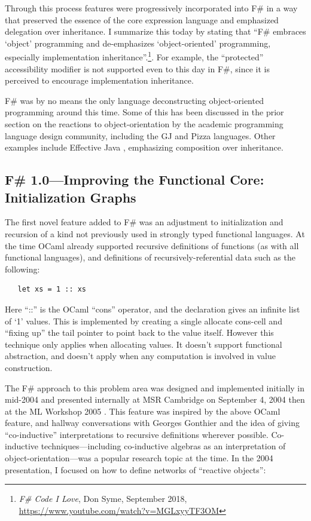 \documentclass[acmsmall]{acmart}\settopmatter{}
\begin{document}
Through this process features were progressively incorporated into F\# in a way that preserved the essence of the core expression language and emphasized delegation over inheritance.  I summarize this today by stating that “F\# embraces ‘object’ programming and de-emphasizes ‘object-oriented’ programming, especially implementation inheritance”.\footnote{\textit{F\# Code I Love}, Don Syme, September 2018, \url{https://www.youtube.com/watch?v=MGLxyyTF3OM}}.  For example, the “protected” accessibility modifier is not supported even to this day in F\#, since it is perceived to encourage implementation inheritance.

F\# was by no means the only language deconstructing object-oriented programming around this time. Some of this has been discussed in the prior section on the reactions to object-orientation by the academic programming language design community, including the GJ and Pizza languages. Other examples include Effective Java \citep{bloch2001effective}, emphasizing composition over inheritance.


\subsection*{F\# 1.0---Improving the Functional Core: Initialization Graphs}

The first novel feature added to F\# was an adjustment to initialization and recursion of a kind not previously used in strongly typed functional languages. At the time OCaml already supported recursive definitions of functions (as with all functional languages), and definitions of recursively-referential data such as the following:
\begin{verbatim}
   let xs = 1 :: xs
\end{verbatim}

Here “::” is the OCaml “cons” operator, and the declaration gives an infinite list of ‘1’ values. This is implemented by creating a single allocate cons-cell and “fixing up” the tail pointer to point back to the value itself.  However this technique only applies when allocating values.  It doesn’t support functional abstraction, and doesn’t apply when any computation is involved in value construction.

The F\# approach to this problem area was designed and implemented initially in mid-2004 and presented internally at MSR Cambridge on September 4, 2004 then at the ML Workshop 2005 \citep{Syme2006}. This feature was inspired by the above OCaml feature, and hallway conversations with Georges Gonthier and the idea of giving “co-inductive” interpretations to recursive definitions wherever possible.  Co-inductive techniques---including co-inductive algebras as an interpretation of object-orientation---was a popular research topic at the time. In the 2004 presentation, I focused on how to define networks of “reactive objects”: 
\end{document}
